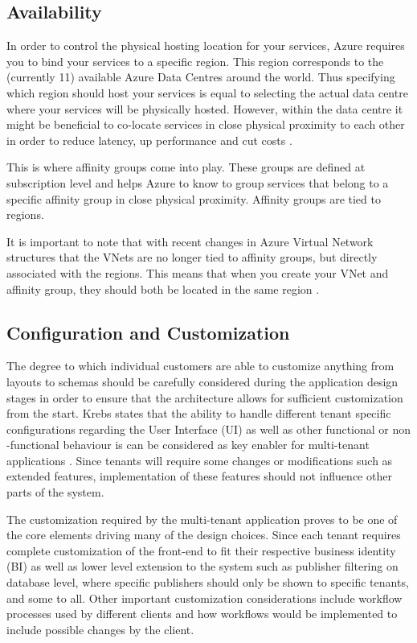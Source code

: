 \subsection{Availability}
\label{sec:availability}
In order to control the physical hosting location for your services, Azure requires you to bind your services to a specific region. This region corresponds to the (currently 11) available Azure Data Centres around the world\cite{Microsoft_Corporation2014-bf}. Thus specifying which region should host your services is equal to selecting the actual data centre where your services will be physically hosted. However, within the data centre it might be beneficial to co-locate services in close physical proximity to each other in order to reduce latency, up performance and cut costs \cite{Microsoft_Corporation2014-dn}.
 

This is where affinity groups come into play. These groups are defined at subscription level and helps Azure to know to group services that belong to a specific affinity group in close physical proximity. Affinity groups are tied to regions.
 
It is important to note that with recent changes in Azure Virtual Network structures that the VNets are no longer tied to affinity groups, but directly associated with the regions. This means that when you create your VNet and affinity group, they should both be located in the same region \cite{Microsoft_Corporation2014-dn}.

\subsection{Configuration and Customization}
\label{sec:custandconf}

The degree to which individual customers are able to customize anything from layouts to schemas should be carefully considered during the application design stages in order to ensure that the architecture allows for sufficient customization from the start. Krebs states that the ability to handle different tenant specific configurations regarding the User Interface (UI) as well as other functional or non -functional behaviour is can be considered as key enabler for multi-tenant applications \cite{Krebs2012}. Since tenants will require some changes or modifications such as extended features, implementation of these features should not influence other parts of the system.
 
The customization required by the multi-tenant application proves to be one of the core elements driving many of the design choices. Since each tenant requires complete customization of the front-end to fit their respective business identity (BI) as well as lower level extension to the system such as publisher filtering on database level, where specific publishers should only be shown to specific tenants, and some to all. Other important customization considerations include workflow processes used by different clients and how workflows would be implemented to include possible changes by the client.


